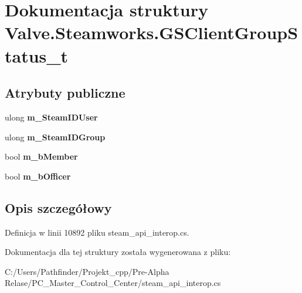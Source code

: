 \hypertarget{struct_valve_1_1_steamworks_1_1_g_s_client_group_status__t}{}\section{Dokumentacja struktury Valve.\+Steamworks.\+G\+S\+Client\+Group\+Status\+\_\+t}
\label{struct_valve_1_1_steamworks_1_1_g_s_client_group_status__t}
\subsection*{Atrybuty publiczne}
\begin{DoxyCompactItemize}
\item 
\mbox{\label{struct_valve_1_1_steamworks_1_1_g_s_client_group_status__t_a60e987e9a652a479ef18419eb380d1b1}} 
ulong {\bfseries m\+\_\+\+Steam\+I\+D\+User}
\item 
\mbox{\label{struct_valve_1_1_steamworks_1_1_g_s_client_group_status__t_aa6a20821d9a9169f1e7f7134c4bc747a}} 
ulong {\bfseries m\+\_\+\+Steam\+I\+D\+Group}
\item 
\mbox{\label{struct_valve_1_1_steamworks_1_1_g_s_client_group_status__t_ab08045e887514cba7dd0a1503aa0ab6d}} 
bool {\bfseries m\+\_\+b\+Member}
\item 
\mbox{\label{struct_valve_1_1_steamworks_1_1_g_s_client_group_status__t_a0d82572ee2f08be01d6114b224e3055e}} 
bool {\bfseries m\+\_\+b\+Officer}
\end{DoxyCompactItemize}


\subsection{Opis szczegółowy}


Definicja w linii 10892 pliku steam\+\_\+api\+\_\+interop.\+cs.



Dokumentacja dla tej struktury została wygenerowana z pliku\+:\begin{DoxyCompactItemize}
\item 
C\+:/\+Users/\+Pathfinder/\+Projekt\+\_\+cpp/\+Pre-\/\+Alpha Relase/\+P\+C\+\_\+\+Master\+\_\+\+Control\+\_\+\+Center/steam\+\_\+api\+\_\+interop.\+cs\end{DoxyCompactItemize}

